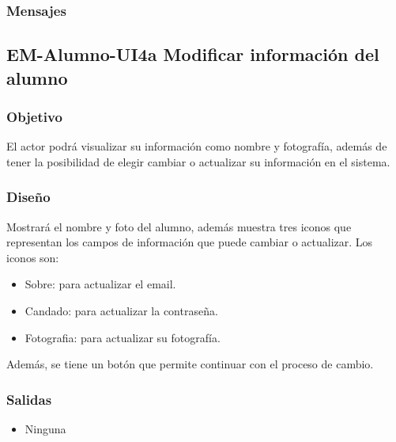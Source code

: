 \subsubsection{Mensajes}
\begin{Citemize}
	\item {}
	\item {}
\end{Citemize}


\pagebreak
\subsection{EM-Alumno-UI4a Modificar información del alumno}

\subsubsection{Objetivo}
	El actor podrá visualizar su información como nombre y fotografía, además de tener la posibilidad de elegir cambiar o actualizar su información en el sistema. 

\subsubsection{Diseño}
	Mostrará el nombre y foto del alumno, además muestra tres iconos que representan los campos de información que puede cambiar o actualizar.
	Los iconos son:
	\begin{itemize} 
		\item Sobre: para actualizar el email.
		\item Candado: para actualizar la contraseña.
		\item Fotografia: para actualizar su fotografía.
	\end{itemize} 
	Además, se tiene un botón  que permite continuar con el proceso de cambio.


\subsubsection{Salidas}
	\begin{itemize} 
		\item Ninguna
	\end{itemize}

